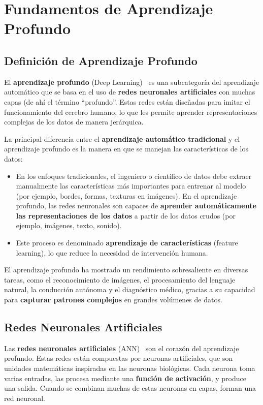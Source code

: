 
\chapter{Fundamentos de Aprendizaje Profundo}\label{ch:fundamentos-de-aprendizaje-profundo}
\section{Definición de Aprendizaje Profundo}\label{sec:definicion-de-aprendizaje-profundo}
El \textbf{aprendizaje profundo} (Deep Learning)~\cite{weidman_deep_2019} es una subcategoría del aprendizaje
automático que se basa en el uso de \textbf{redes neuronales artificiales} con muchas capas (de ahí el término
``profundo''.
Estas redes están diseñadas para imitar el funcionamiento del cerebro humano, lo que les permite aprender
representaciones complejas de los datos de manera jerárquica.


La principal diferencia entre el \textbf{aprendizaje automático tradicional} y el aprendizaje profundo es la manera en
que se manejan las características de los datos:
\begin{itemize}
    \item En los enfoques tradicionales, el ingeniero o científico de datos debe extraer manualmente las
          características más importantes para entrenar al modelo (por ejemplo, bordes, formas, texturas en imágenes).
          En el aprendizaje profundo, las redes neuronales son capaces de
          \textbf{aprender automáticamente las representaciones de los datos} a partir de los datos crudos (por ejemplo,
          imágenes, texto, sonido).
    \item Este proceso es denominado \textbf{aprendizaje de características} (feature learning), lo que reduce la
          necesidad de intervención humana.
\end{itemize}

El aprendizaje profundo ha mostrado un rendimiento sobresaliente en diversas tareas, como el reconocimiento de
imágenes, el procesamiento del lenguaje natural, la conducción autónoma y el diagnóstico médico, gracias a su capacidad
para \textbf{capturar patrones complejos} en grandes volúmenes de datos.

\section{Redes Neuronales Artificiales}\label{sec:redes-neuronales-artificiales}
Las \textbf{redes neuronales artificiales} (ANN)~\cite{sydenham_handbook_2005} son el corazón del aprendizaje profundo.
Estas redes están compuestas por neuronas artificiales, que son unidades matemáticas inspiradas en las neuronas
biológicas.
Cada neurona toma varias entradas, las procesa mediante una \textbf{función de activación}, y produce una salida.
Cuando se combinan muchas de estas neuronas en capas, forman una red neuronal.

